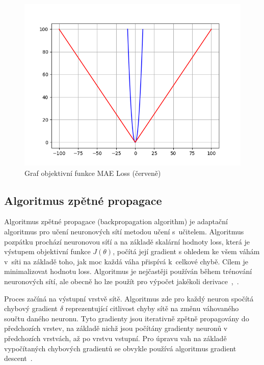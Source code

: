 \begin{figure}[H]
    \centering
    \includegraphics[scale=0.4]{obrazky-figures/maeloss.png}
    \caption{\label{fig:maeloss}Graf objektivní funkce MAE Loss (červeně)}
\end{figure}


\subsection{Algoritmus zpětné propagace}
Algoritmus zpětné propagace (backpropagation algorithm) je adaptační algoritmus pro učení neuronových sítí metodou učení s~učitelem. Algoritmus pozpátku prochází neuronovou síťí a na základě skalární hodnoty loss, která je výstupem objektivní funkce $J(\theta)$, počítá její gradient s ohledem ke všem váhám v~síti na základě toho, jak moc každá váha přispívá k~celkové chybě. Cílem je minimalizovat hodnotu loss. Algoritmus je nejčastěji používán během trénování neuronových sítí, ale obecně ho lze použít pro výpočet jakékoli derivace~\cite{mitdeeplearning_small},~\cite{mitdeeplearning}.

Proces začíná na výstupní vrstvě sítě. Algoritmus zde pro každý neuron spočítá chybový gradient $\delta$ reprezentující citlivost chyby sítě na změnu váhovaného součtu daného neuronu. Tyto gradienty jsou iterativně zpětně propagovány do předchozích vrstev, na základě nichž jsou počítány gradienty neuronů v předchozích vrstvách, až po vrstvu vstupní. Pro úpravu vah na základě vypočítaných chybových gradientů se obvykle používá algoritmus gradient descent~\cite{mitdeeplearning_small}.




